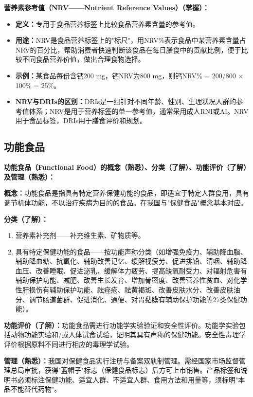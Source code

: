 \begin{keybox}
\textbf{营养素参考值（NRV——Nutrient Reference Values）（掌握）：}
\begin{itemize}[leftmargin=*]
    \item \textbf{定义：}专用于食品营养标签上比较食品营养素含量的参考值。
    \item \textbf{用途：}NRV是食品营养标签上的"标尺"，用NRV\%表示食品中某营养素含量占NRV的百分比，帮助消费者快速判断该食品在每日膳食中的贡献比例，便于比较不同食品营养价值，做出合理食物选择。
    \item \textbf{示例：}某食品每份含钙200 mg，钙NRV为800 mg，则钙NRV\% = 200/800 $\times$ 100\% = 25\%。
    \item \textbf{NRV与DRIs的区别：}DRIs是一组针对不同年龄、性别、生理状况人群的参考值体系；NRV是用于营养标签的单一参考值，通常采用成人RNI或AI。NRV用于食品标签，DRIs用于膳食评价和规划。
\end{itemize}
\end{keybox}

\subsection{功能食品}

\begin{defbox}
\textbf{功能食品（Functional Food）的概念（熟悉）、分类（了解）、功能评价（了解）及管理（熟悉）：}

\textbf{概念：}功能食品是指具有特定营养保健功能的食品，即适宜于特定人群食用，具有调节机体功能，不以治疗疾病为目的的食品。在我国与"保健食品"概念基本对应。

\textbf{分类（了解）：}
\begin{enumerate}[leftmargin=*]
    \item 营养素补充剂——补充维生素、矿物质等。
    \item 具有特定保健功能的食品——按功能声称分类（如增强免疫力、辅助降血脂、辅助降血糖、抗氧化、辅助改善记忆、缓解视疲劳、促进排铅、清咽、辅助降血压、改善睡眠、促进泌乳、缓解体力疲劳、提高缺氧耐受力、对辐射危害有辅助保护功能、减肥、改善生长发育、增加骨密度、改善营养性贫血、对化学性肝损伤有辅助保护功能、祛痤疮、祛黄褐斑、改善皮肤水分、改善皮肤油分、调节肠道菌群、促进消化、通便、对胃黏膜有辅助保护功能等27类保健功能）。
\end{enumerate}

\textbf{功能评价（了解）：}功能食品需进行功能学实验验证和安全性评价。功能学实验包括动物功能实验和/或人体试食试验，证明其具有声称的保健功能。安全性毒理学评价根据原料不同进行相应的毒理学试验。

\textbf{管理（熟悉）：}我国对保健食品实行注册与备案双轨制管理。需经国家市场监督管理总局审批，获得"蓝帽子"标志（保健食品标志）后方可上市销售。产品标签和说明书必须标注保健功能、适宜人群、不适宜人群、食用方法和用量等，须标明"本品不能替代药物"。
\end{defbox}

